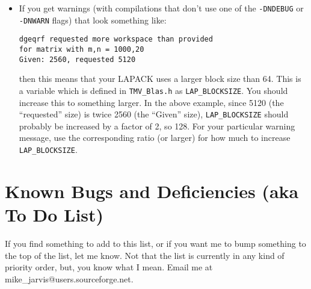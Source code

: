 \documentclass[twoside,letterpaper,11pt]{article}
\makeatletter
\renewcommand{\tt}[1]{{\texttt {#1}}}
\newcommand{\myemail}{mike\_jarvis@users.sourceforge.net}
\makeatother
\begin{document}
\begin{itemize}
\item
If you get warnings (with compilations that don't use one of the 
\tt{-DNDEBUG} or \tt{-DNWARN} flags)
that look something like:
\begin{verbatim}
dgeqrf requested more workspace than provided 
for matrix with m,n = 1000,20 
Given: 2560, requested 5120
\end{verbatim}
then this means that your LAPACK uses a larger block size than 64.  This is 
a variable which is defined in \tt{TMV\_Blas.h} as \tt{LAP\_BLOCKSIZE}.
You should increase this to something larger.  In the above example, since
5120 (the ``requested'' size) is twice 2560 (the ``Given'' size), 
\tt{LAP\_BLOCKSIZE} should probably be increased by a factor of 2, so 128.
For your particular warning message, use the corresponding ratio (or larger)
for how much to increase \tt{LAP\_BLOCKSIZE}.
\end{itemize}

\newpage
\section{Known Bugs and Deficiencies (aka To Do List)}

If you find something to add to this list, or if you want me to bump something
to the top of the list, let me know.  Not that the list is currently in any kind of 
priority order, but, you know what I mean.  Email me at \myemail.
\end{document}
